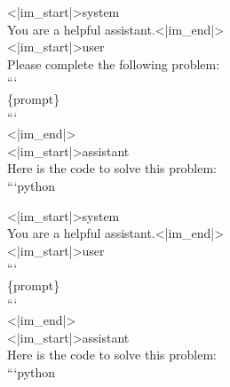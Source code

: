 \begin{table}[h]
    \centering
    \begin{minipage}[t]{0.48\textwidth}
        \captionsetup{width=\linewidth}
        \caption{Chat template during the evaluation for HumanEval and BigCodeBench (C).}
        \label{tab:temp1}
        \centering
        \begin{tcolorbox}[
            colback=gray!10,
            boxrule=0.5pt,
            left=2mm,right=2mm,
            top=2mm,bottom=2mm,
            width=\linewidth,
        ]
{\ttfamily\small
<|im\_start|>system\\
You are a helpful assistant.<|im\_end|>\\
<|im\_start|>user\\
Please complete the following problem:\\
```\\
\{prompt\}\\
```\\
<|im\_end|>\\
<|im\_start|>assistant\\
Here is the code to solve this problem:\\
```python
}
        \end{tcolorbox}
    \end{minipage}\hfill
    \begin{minipage}[t]{0.48\textwidth}
        \captionsetup{width=\linewidth}
        \caption{Chat template during the evaluation for MBPP and BigCodeBench (I).}
        \label{tab:temp2}
        \centering
        \begin{tcolorbox}[
            colback=gray!10,
            boxrule=0.5pt,
            left=2mm,right=2mm,
            top=2mm,bottom=2mm,
            width=\linewidth,
        ]
{\ttfamily\small
<|im\_start|>system\\
You are a helpful assistant.<|im\_end|>\\
<|im\_start|>user\\
```\\
\{prompt\}\\
```\\
<|im\_end|>\\
<|im\_start|>assistant\\
Here is the code to solve this problem:\\
```python
}
        \end{tcolorbox}
    \end{minipage}
\end{table}
